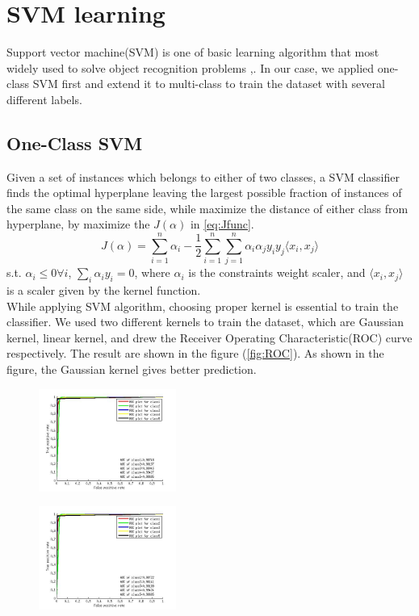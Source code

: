 \documentclass{article}
\begin{document}
\section{SVM learning}
Support vector machine(SVM) is one of basic learning algorithm that most widely used to solve object recognition problems \cite{HogDetection1},\cite{SVMforRecogintion}. In our case, we applied one-class SVM first and extend it to multi-class to train the dataset with several different labels.
\subsection{One-Class SVM}
Given a set of instances which belongs to either of two classes, a SVM classifier finds the optimal hyperplane leaving the largest possible fraction of instances of the same class on the same side, while maximize the distance of either class from hyperplane, by maximize the $J(\alpha)$ in \ref{eq:Jfunc}.
\begin{equation}
J(\alpha) = \sum_{i=1}^n \alpha_i - \frac{1}{2}\sum_{i=1}^n\sum_{j=1}^n \alpha_i \alpha_jy_iy_j\langle x_i,x_j\rangle
\label{eq:Jfunc}
\end{equation}
s.t. $\alpha_i\leq 0 \forall i$, $\sum_i \alpha_iy_i = 0$,
where $\alpha_i$ is the constraints weight scaler, and $\langle x_i,x_j \rangle$ is a scaler given by the kernel function.\\
While applying SVM algorithm, choosing proper kernel is essential to train the classifier. We used two different kernels to train the dataset, which are Gaussian kernel, linear kernel, and drew the Receiver	Operating Characteristic(ROC) curve respectively. The result are shown in the figure (\ref{fig:ROC}). As shown in the figure, the Gaussian kernel gives better prediction.\\
\begin{figure}[htb]
\centering
\includegraphics[width = 0.4\textwidth]{ROCgauss.jpg}
\end{figure}

\begin{figure}[htb]
\centering
\includegraphics[width = 0.4\textwidth]{ROClinear.jpg}
\end{figure}
\end{document}
